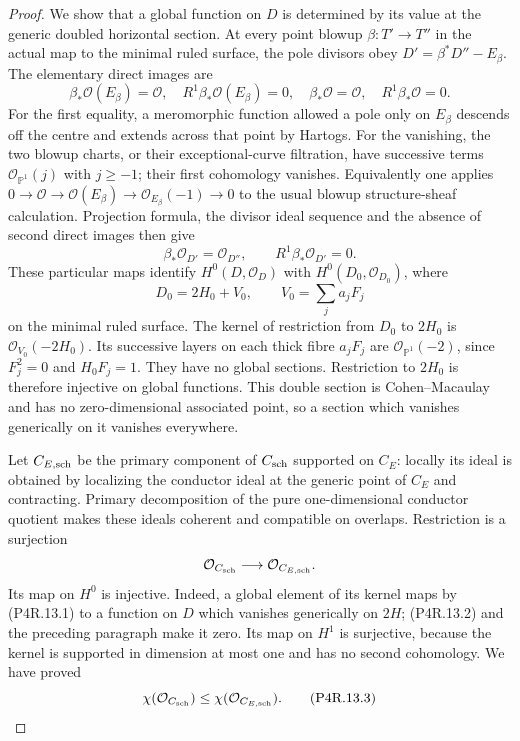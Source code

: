 \begin{proof}
We show that a global function on $D$ is determined by
its value at the generic doubled horizontal section.
At every point blowup $\beta:T'\to T''$ in the actual
map to the minimal ruled surface, the pole divisors obey
$D'=\beta^*D''-E_\beta$. The elementary direct images are
\[
 \beta_*\mathcal O(E_\beta)=\mathcal O,
 \quad R^1\beta_*\mathcal O(E_\beta)=0,
 \quad\beta_*\mathcal O=\mathcal O,
 \quad R^1\beta_*\mathcal O=0.
\]
For the first equality, a meromorphic function allowed
a pole only on $E_\beta$ descends off the centre and
extends across that point by Hartogs. For the vanishing,
the two blowup charts, or their exceptional-curve
filtration, have successive terms
$\mathcal O_{\mathbb P^1}(j)$ with $j\ge-1$;
their first cohomology vanishes. Equivalently one applies
$0\to\mathcal O\to\mathcal O(E_\beta)
\to\mathcal O_{E_\beta}(-1)\to0$ to the usual
blowup structure-sheaf calculation. Projection formula,
the divisor ideal sequence and the absence of second
direct images then give
\[
 \beta_*\mathcal O_{D'}=\mathcal O_{D''},
 \qquad R^1\beta_*\mathcal O_{D'}=0.                         \tag{P4R.13.2}
\]
These particular maps identify $H^0(D,\mathcal O_D)$
with $H^0(D_0,\mathcal O_{D_0})$, where
\[
 D_0=2H_0+V_0,
 \qquad V_0=\sum_j a_jF_j
\]
on the minimal ruled surface. The kernel of restriction
from $D_0$ to $2H_0$ is $\mathcal O_{V_0}(-2H_0)$.
Its successive layers on each thick fibre $a_jF_j$ are
$\mathcal O_{\mathbb P^1}(-2)$, since $F_j^2=0$ and
$H_0F_j=1$. They have no global sections. Restriction
to $2H_0$ is therefore injective on global functions.
This double section is Cohen--Macaulay and has no
zero-dimensional associated point, so a section which
vanishes generically on it vanishes everywhere.

Let $C_{E,\rm sch}$ be the primary component of
$C_{\rm sch}$ supported on $C_E$: locally its ideal
is obtained by localizing the conductor ideal at the
generic point of $C_E$ and contracting. Primary
decomposition of the pure one-dimensional conductor
quotient makes these ideals coherent and compatible
on overlaps. Restriction is a surjection
\[
 \mathcal O_{C_{\rm sch}}\longrightarrow
 \mathcal O_{C_{E,\rm sch}}.
\]
Its map on $H^0$ is injective. Indeed, a global element
of its kernel maps by (P4R.13.1) to a function on $D$
which vanishes generically on $2H$; (P4R.13.2) and the
preceding paragraph make it zero. Its map on $H^1$
is surjective, because the kernel is supported in
dimension at most one and has no second cohomology.
We have proved
\[
 \chi(\mathcal O_{C_{\rm sch}})
 \le\chi(\mathcal O_{C_{E,\rm sch}}).                       \tag{P4R.13.3}
\]


\end{proof}
